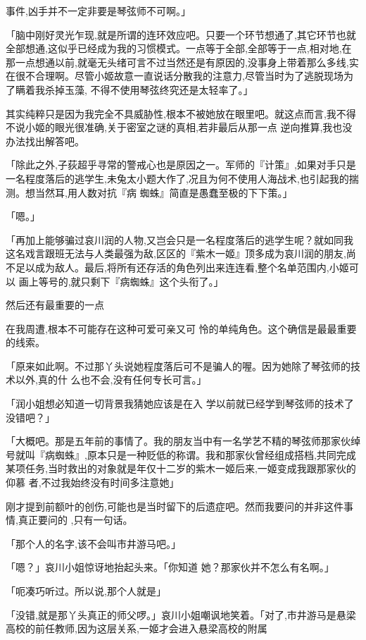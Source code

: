 \documentclass{article}
\begin{document}
\newpage
事件,凶手并不一定非要是琴弦师不可啊。」 

「脑中刚好灵光乍现,就是所谓的连环效应吧。只要一个环节想通了,其它环节也就全部想通,这似乎已经成为我的习惯模式。一点等于全部,全部等于一点,相对地,在那一点想通以前,就毫无头绪可言不过当然还是有原因的,没事身上带着那么多线,实在很不合理啊。尽管小姬故意一直说话分散我的注意力,尽管当时为了逃脱现场为了瞒着我杀掉玉藻,
不得不使用琴弦终究还是太轻率了。」 

其实纯粹只是因为我完全不具威胁性,根本不被她放在眼里吧。就这点而言,我不得不说小姬的眼光很准确,关于密室之谜的真相,若非最后从那一点
逆向推算,我也没办法找出解答吧。 

「除此之外,子荻超乎寻常的警戒心也是原因之一。军师的『计策』,如果对手只是一名程度落后的逃学生,未兔太小题大作了,况且为何不使用人海战术,也引起我的揣测。想当然耳,用人数对抗『病
蜘蛛』简直是愚蠢至极的下下策。」 

\newpage


「嗯。」 

「再加上能够骗过哀川润的人物,又岂会只是一名程度落后的逃学生呢？就如同我这名戏言跟班无法与人类最强为敌,区区的『紫木一姬』顶多成为哀川润的朋友,尚不足以成为敌人。最后,将所有还存活的角色列出来连连看,整个名单范围内,小姬可以
画上等号的,就只剩下『病蜘蛛』这个头衔了。」 


然后还有最重要的一点 

在我周遭,根本不可能存在这种可爱可亲又可
怜的单纯角色。这个确信是最最重要的线索。 

「原来如此啊。不过那丫头说她程度落后可不是骗人的喔。因为她除了琴弦师的技术以外,真的什
么也不会,没有任何专长可言。」 

「润小姐想必知道一切背景我猜她应该是在入
学以前就已经学到琴弦师的技术了没错吧？」 

\newpage

「大概吧。那是五年前的事情了。我的朋友当中有一名学艺不精的琴弦师那家伙绰号就叫『病蜘蛛』,原本只是一种贬低的称谓。我和那家伙曾经组成搭档,共同完成某项任务,当时救出的对象就是年仅十二岁的紫木一姬后来,一姬变成我跟那家伙的仰慕
者,不过我始终没有时间多注意她」 

刚才提到前额叶的创伤,可能也是当时留下的后遗症吧。然而我要问的并非这件事情,真正要问的
,只有一句话。 


「那个人的名字,该不会叫市井游马吧。」 

「嗯？」哀川小姐惊讶地抬起头来。「你知道
她？那家伙并不怎么有名啊。」 


「呃凑巧听过。所以说,那个人就是」 

「没错,就是那丫头真正的师父啰。」哀川小姐嘲讽地笑着。「对了,市井游马是悬梁高校的前任教师,因为这层关系,一姬才会进入悬梁高校的附属
\newpage
\end{document}
